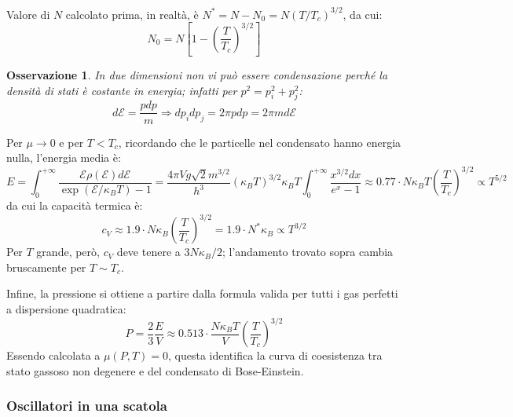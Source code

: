 \documentclass[10pt, a4paper]{scrartcl}
\numberwithin{equation}{subsection}
\theoremstyle{style1}
\newtheorem{osservazione}{Osservazione}[section]
\theoremstyle{style2}
\begin{document}
Valore di $N$ calcolato prima, in realt\`a, \`e $N^* = N - N_0 = N (T / T_c)^{3 / 2} $, da cui:
\begin{equation}
	N_0 = N \left[1 - \left(\frac{T}{T_c}\right) ^{3 / 2} \right] 
\end{equation}
\begin{osservazione}
	In due dimensioni non vi pu\`o essere condensazione perch\'e la densit\`a di stati \`e costante in energia; infatti per $p^2=p_i^2+p_j^2$:
	\[
	d \mathscr{E} = \frac{p dp }{m} \Rightarrow dp_i dp_j = 2 \pi p dp = 2\pi m d\mathscr{E}
	\] 
\end{osservazione}
\noindent Per $\mu \to 0$ e per $T< T_c$, ricordando che le particelle nel condensato hanno energia nulla, l'energia media \`e:
\begin{equation}
		E = \int_{0} ^{+\infty}\frac{\mathscr{E}\rho  ( \mathscr{E}) d \mathscr{E}}{\exp(\mathscr{E} / \kappa _B T) - 1} = \frac{4\pi V g \sqrt{2} m^{3 / 2} }{h^3} (\kappa _BT)^{ 3 / 2} \kappa _B T \int_{0} ^{+\infty} \frac{x ^{3 / 2} dx}{e^x - 1}\approx 0.77 \cdot N\kappa _B T \left(\frac{T}{T_c}\right) ^{3 / 2} \propto T^{5 / 2} 
\end{equation}
da cui la capacit\`a termica \`e:
\begin{equation}
	c_V \approx 1.9 \cdot  N\kappa _B \left(\frac{T}{T_c}\right) ^{3 / 2} = 1.9 \cdot  N^* \kappa _B \propto T^{3 / 2} 
\end{equation}
Per $T$ grande, per\`o, $c_V $ deve tenere a $3N\kappa _B / 2$; l'andamento trovato sopra cambia bruscamente per $T \sim T_c$.

Infine, la pressione si ottiene a partire dalla formula valida per tutti i gas perfetti a dispersione quadratica:
\begin{equation}
	P = \frac{2}{3} \frac{E}{V} \approx 0.513 \cdot  \frac{N\kappa _B T}{V} \left(\frac{T}{T_c}\right) ^{3/2} 
\end{equation}
Essendo calcolata a $\mu (P,T) = 0$, questa identifica la curva di coesistenza tra stato gassoso non degenere e del condensato di Bose-Einstein.

\subsubsection{Oscillatori in una scatola}
\end{document}
